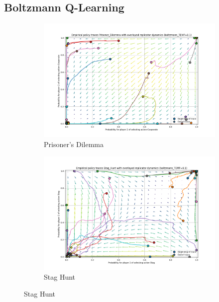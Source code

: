 \documentclass[12pt,a4paper, onecolumn]{exam}
\begin{document}
\begin{appendices}
    \subsection{Boltzmann Q-Learning}

    \begin{figure}[H]
        \centering
        \begin{subfigure}{0.44\textwidth}
            \centering
            \includegraphics[width=\linewidth]{plots/replicator_trajectoreis_Prisoner_Dilemma_boltzmann_TEMP=0.1.png}
            \caption{Prisoner's Dilemma}
        \end{subfigure}
        \hfill
        \begin{subfigure}{0.44\textwidth}
            \centering
            \includegraphics[width=\linewidth]{plots/replicator_trajectoreis_Stag_Hunt_boltzmann_TEMP=0.1.png}
            \caption{Stag Hunt}
        \end{subfigure}

\end{figure}
\end{appendices}
\end{document}
